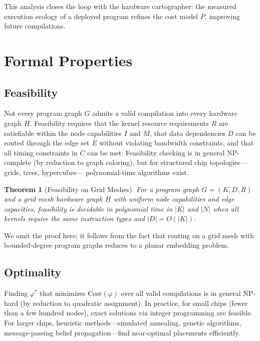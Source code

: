 \documentclass[11pt, a4paper]{article}
\newtheorem{theorem}{Theorem}
\begin{document}
This analysis closes the loop with the hardware cartographer: the measured execution
ecology of a deployed program refines the cost model $P$, improving future compilations.

\section{Formal Properties}

\subsection{Feasibility}

Not every program graph $G$ admits a valid compilation into every hardware graph $H$.
Feasibility requires that the kernel resource requirements $R$ are satisfiable within
the node capabilities $I$ and $M$, that data dependencies $D$ can be routed through
the edge set $E$ without violating bandwidth constraints, and that all timing constraints
in $C$ can be met. Feasibility checking is in general NP-complete (by reduction to
graph coloring), but for structured chip topologies---grids, trees, hypercubes---
polynomial-time algorithms exist.

\begin{theorem}[Feasibility on Grid Meshes]
For a program graph $G = (K, D, R)$ and a grid mesh hardware graph $H$ with uniform
node capabilities and edge capacities, feasibility is decidable in polynomial time
in $|K|$ and $|N|$ when all kernels require the same instruction types and
$|D| = O(|K|)$.
\end{theorem}

We omit the proof here; it follows from the fact that routing on a grid mesh with
bounded-degree program graphs reduces to a planar embedding problem.

\subsection{Optimality}

Finding $\varphi^*$ that minimizes $\text{Cost}(\varphi)$ over all valid compilations
is in general NP-hard (by reduction to quadratic assignment). In practice, for small
chips (fewer than a few hundred nodes), exact solutions via integer programming are
feasible. For larger chips, heuristic methods---simulated annealing, genetic algorithms,
message-passing belief propagation---find near-optimal placements efficiently.
\end{document}
